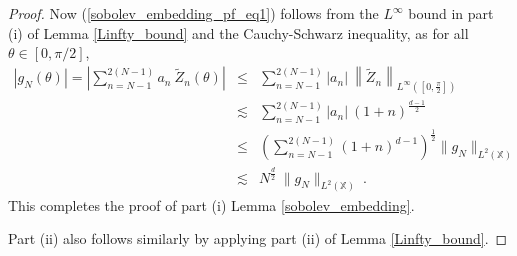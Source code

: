 \documentclass[12pt]{amsart}
\theoremstyle{definition}
\newcommand{\X}{\mathbb X}%
\numberwithin{equation}{section}
\begin{document}
\begin{proof}
Now (\ref{sobolev_embedding_pf_eq1}) follows from the $L^\infty$ bound in part (i) of Lemma \ref{Linfty_bound} and the Cauchy-Schwarz inequality, as for all $\theta \in [0,\pi/2]$,
\begin{eqnarray*}
\left|g_N(\theta)\right| = \left|\sum_{n=N-1}^{2(N-1)} a_n\:\tilde{Z}_n(\theta)\right| &\le & \sum_{n=N-1}^{2(N-1)} \left|a_n\right|\:\left\|\tilde{Z}_n\right\|_{L^\infty\left(\left[0,\frac{\pi}{2}\right]\right)} \\
& \lesssim & \sum_{n=N-1}^{2(N-1)} \left|a_n\right|\: {\left(1+n\right)}^{\frac{d-1}{2}} \\
& \le & \left(\sum_{n=N-1}^{2(N-1)}{\left(1+n\right)}^{d-1}\right)^{\frac{1}{2}}\|g_N\|_{L^2(\X)} \\
& \lesssim & N^{\frac{d}{2}}\:\|g_N\|_{L^2(\X)}\:.
\end{eqnarray*}
This completes the proof of  part (i) Lemma \ref{sobolev_embedding}.

Part (ii) also follows similarly by applying part (ii) of Lemma \ref{Linfty_bound}.
\end{proof}
\end{document}
